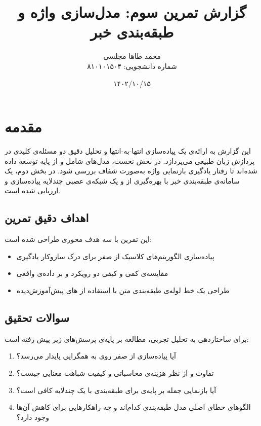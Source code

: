 \documentclass[12pt,a4paper]{article}
\title{گزارش تمرین سوم: مدل‌سازی واژه و طبقه‌بندی خبر}
\author{محمد طاها مجلسی \\ شماره دانشجویی: ۸۱۰۱۰۱۵۰۴}
\date{۱۴۰۲/۱۰/۱۵}
\begin{document}
\maketitle

\tableofcontents
\newpage

\section{مقدمه}
این گزارش به ارائه‌ی یک پیاده‌سازی انتها-به-انتها و تحلیل دقیق دو مسئله‌ی کلیدی در پردازش زبان طبیعی می‌پردازد. در بخش نخست، مدل‌های  شامل  و  از پایه توسعه داده شده‌اند تا رفتار یادگیری بازنمایی واژه به‌صورت شفاف بررسی شود. در بخش دوم، یک سامانه‌ی طبقه‌بندی خبر با بهره‌گیری از  و یک شبکه‌ی عصبی چندلایه پیاده‌سازی و ارزیابی شده است.

\subsection{اهداف دقیق تمرین}
این تمرین با سه هدف محوری طراحی شده است:
\begin{itemize}
\item پیاده‌سازی الگوریتم‌های کلاسیک  از صفر برای درک سازوکار یادگیری 
\item مقایسه‌ی کمی و کیفی دو رویکرد  و  بر داده‌ی واقعی
\item طراحی یک خط لوله‌ی طبقه‌بندی متن با استفاده از های پیش‌آموزش‌دیده
\end{itemize}

\subsection{سوالات تحقیق}
برای ساختاردهی به تحلیل تجربی، مطالعه بر پایه‌ی پرسش‌های زیر پیش رفته است:
\begin{enumerate}
\item آیا پیاده‌سازی  از صفر روی  به همگرایی پایدار می‌رسد؟
\item تفاوت  و  از نظر هزینه‌ی محاسباتی و کیفیت شباهت معنایی چیست؟
\item آیا بازنمایی جمله بر پایه‌ی  برای طبقه‌بندی  با یک  چندلایه کافی است؟
\item الگوهای خطای اصلی مدل طبقه‌بندی کدام‌اند و چه راهکارهایی برای کاهش آن‌ها وجود دارد؟
\end{enumerate}
\end{document}
